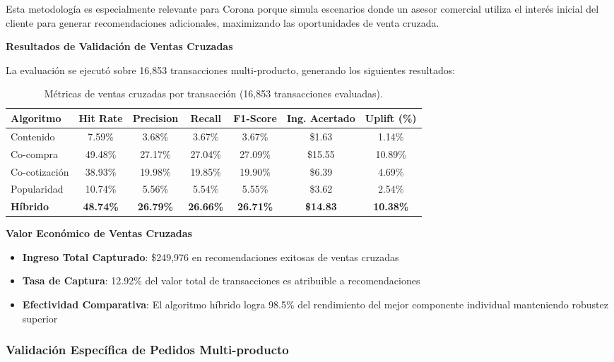 \documentclass[twocolumn]{article}
\begin{document}
Esta metodología es especialmente relevante para Corona porque simula escenarios donde un asesor comercial utiliza el interés inicial del cliente para generar recomendaciones adicionales, maximizando las oportunidades de venta cruzada.

\textbf{Resultados de Validación de Ventas Cruzadas}

La evaluación se ejecutó sobre 16,853 transacciones multi-producto, generando los siguientes resultados:

\begin{table}[H]
\centering
\tiny
\begin{tabular}{|l|c|c|c|c|c|c|}
\hline
\textbf{Algoritmo} & \textbf{Hit Rate} & \textbf{Precision} & \textbf{Recall} & \textbf{F1-Score} & \textbf{Ing. Acertado} & \textbf{Uplift (\%)} \\
\hline
Contenido & 7.59\% & 3.68\% & 3.67\% & 3.67\% & \$1.63 & 1.14\% \\
\hline
Co-compra & 49.48\% & 27.17\% & 27.04\% & 27.09\% & \$15.55 & 10.89\% \\
\hline
Co-cotización & 38.93\% & 19.98\% & 19.85\% & 19.90\% & \$6.39 & 4.69\% \\
\hline
Popularidad & 10.74\% & 5.56\% & 5.54\% & 5.55\% & \$3.62 & 2.54\% \\
\hline
\textbf{Híbrido} & \textbf{48.74\%} & \textbf{26.79\%} & \textbf{26.66\%} & \textbf{26.71\%} & \textbf{\$14.83} & \textbf{10.38\%} \\
\hline
\end{tabular}
\caption{Métricas de ventas cruzadas por transacción (16,853 transacciones evaluadas).}
\end{table}

\textbf{Valor Económico de Ventas Cruzadas}
\begin{itemize}
    \item \textbf{Ingreso Total Capturado}: \$249,976 en recomendaciones exitosas de ventas cruzadas
    \item \textbf{Tasa de Captura}: 12.92\% del valor total de transacciones es atribuible a recomendaciones
    \item \textbf{Efectividad Comparativa}: El algoritmo híbrido logra 98.5\% del rendimiento del mejor componente individual manteniendo robustez superior
\end{itemize}

\subsubsection{Validación Específica de Pedidos Multi-producto}
\end{document}
